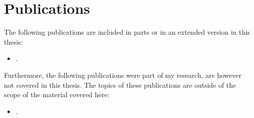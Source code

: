 \chapter*{Publications}
\label{chap:publications}

The following publications are included in parts or in an extended version in this thesis:
\begin{itemize}
    \item {}.
\end{itemize}

Furthermore, the following publications were part of my research, are however not covered in this thesis.
The topics of these publications are outside of the scope of the material covered here:
\begin{itemize}
    \item {}.
\end{itemize}

